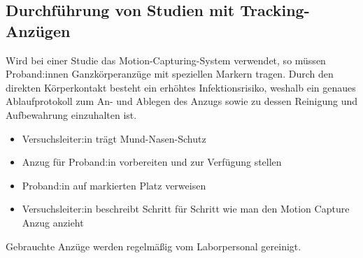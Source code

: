 \subsection{Durchführung von Studien mit Tracking-Anzügen}\label{subsec:nutzerstudien_mocap}


Wird bei einer Studie das Motion-Capturing-System verwendet, so müssen Proband:innen Ganzkörperanzüge mit speziellen Markern tragen.
Durch den direkten Körperkontakt besteht ein erhöhtes Infektionsrisiko, weshalb ein genaues Ablaufprotokoll zum An- und Ablegen des Anzugs sowie zu dessen Reinigung und Aufbewahrung einzuhalten ist.

{
\singlespacing
\begin{itemize}
    \item Versuchsleiter:in trägt Mund-Nasen-Schutz
    \item Anzug für Proband:in vorbereiten und zur Verfügung stellen
    \item Proband:in auf markierten Platz verweisen 
    \item Versuchsleiter:in beschreibt Schritt für Schritt wie man den Motion Capture Anzug anzieht
\end{itemize}
}

Gebrauchte Anzüge werden regelmäßig vom Laborpersonal gereinigt.

